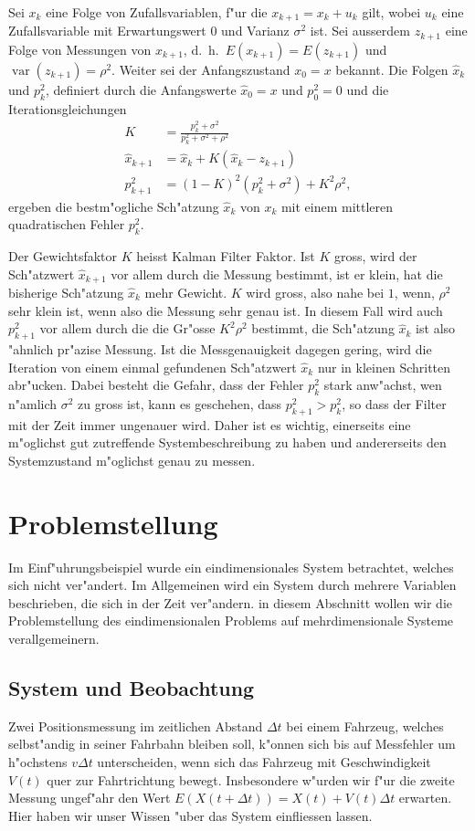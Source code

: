 \begin{satz}
Sei $x_k$ eine Folge von Zufallsvariablen, f"ur die $x_{k+1}=x_k+u_k$ gilt, wobei
$u_k$ eine Zufallsvariable mit Erwartungswert $0$ und Varianz $\sigma^2$ ist.
Sei
ausserdem $z_{k+1}$ eine Folge von Messungen von $x_{k+1}$, d.~h.~$E(x_{k+1})=E(z_{k+1})$
und $\operatorname{var}(z_{k+1})=\rho^2$.
Weiter sei der Anfangszustand $x_0=x$ bekannt.
Die Folgen $\hat x_k$ und $p_k^2$, definiert durch die Anfangswerte
$\hat x_0=x$ und $p_0^2=0$ und die Iterationsgleichungen
\begin{align*}
K&=\frac{p_k^2+\sigma^2}{p_k^2+\sigma^2+\rho^2}\\
\hat x_{k+1}&=\hat x_k + K (\hat x_k-z_{k+1})\\
p_{k+1}^2&=(1-K)^2(p_k^2+\sigma^2)+K^2\rho^2,
\end{align*}
ergeben die bestm"ogliche Sch"atzung $\hat x_k$ von $x_k$ mit
einem mittleren quadratischen Fehler $p_k^2$.
\end{satz}
Der Gewichtsfaktor $K$ heisst Kalman Filter Faktor.
Ist $K$ gross, wird der
Sch"atzwert $\hat x_{k+1}$ vor allem durch die Messung bestimmt, ist er
klein, hat die bisherige Sch"atzung $\hat x_k$ mehr Gewicht.
$K$ wird gross,
also nahe bei $1$, wenn, $\rho^2$ sehr klein ist, wenn also die Messung
sehr genau ist.
In diesem Fall wird auch $p_{k+1}^2$ vor allem durch die
die Gr"osse $K^2\rho^2$ bestimmt, die Sch"atzung $\hat x_k$  ist also
"ahnlich pr"azise Messung.
Ist die Messgenauigkeit dagegen gering,
wird die Iteration von einem einmal gefundenen Sch"atzwert $\hat x_k$
nur in kleinen Schritten abr"ucken.
Dabei besteht die Gefahr, dass
der Fehler $p_k^2$ stark anw"achst, wen n"amlich $\sigma^2$ zu gross
ist, kann es geschehen, dass $p_{k+1}^2>p_{k}^2$, so dass der Filter
mit der Zeit immer ungenauer wird.
Daher ist es wichtig, einerseits
eine m"oglichst gut zutreffende Systembeschreibung zu haben und andererseits
den Systemzustand m"oglichst genau zu messen.

\section{Problemstellung}
Im Einf"uhrungsbeispiel wurde ein eindimensionales System betrachtet,
welches sich nicht ver"andert.
Im Allgemeinen wird ein System durch
mehrere Variablen beschrieben, die sich in der Zeit ver"andern.
in diesem Abschnitt wollen wir die Problemstellung des eindimensionalen
Problems auf mehrdimensionale Systeme verallgemeinern.

\subsection{System und Beobachtung}
Zwei Positionsmessung im zeitlichen Abstand $\Delta t$
bei einem Fahrzeug, welches selbst"andig
in seiner Fahrbahn bleiben soll, k"onnen sich bis auf Messfehler um h"ochstens
$v\Delta t$ unterscheiden, wenn sich das Fahrzeug mit Geschwindigkeit $V(t)$
quer zur Fahrtrichtung bewegt.
Insbesondere w"urden wir f"ur die zweite
Messung ungef"ahr den Wert $E(X(t+\Delta t)) = X(t) + V(t)\Delta t$
erwarten.
Hier haben wir unser Wissen "uber das System einfliessen lassen.

